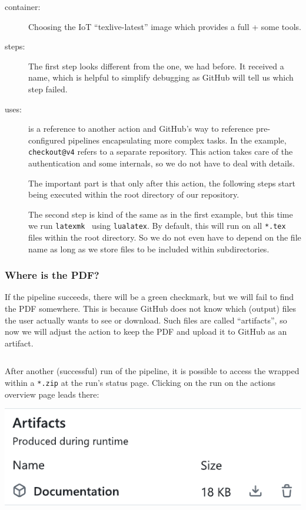 \documentclass[final]{ltugboat}
\newcommand*{\TeXLive}{\acro{\TeX\,Live}\xspace}
\newcommand*{\action}[1]{\texttt{#1}}
\newcommand*{\command}[1]{\texttt{#1}}
\newcommand*{\file}[1]{\texttt{#1}}
\newcommand*{\containerimage}[1]{\enquote{#1}}
\begin{document}
\begin{description}
\item[container:] Choosing the IoT \containerimage{texlive-latest} image which provides a full \TeXLive{} + some tools\cite{islandoftex-docker}.
\item[steps:]
The first step looks different from the one, we had before.
It received a name, which is helpful to simplify debugging as GitHub will tell us which step failed.

\item[uses:] is a reference to another action and GitHub's way to reference pre-configured pipelines encapsulating more complex tasks.
In the example, \action{checkout@v4} refers to a separate repository\cite{github-action-checkout}.
This action takes care of the authentication and some internals, so we do not have to deal with details.

The important part is that only after this action, the following steps start being executed within the root directory of our repository.

The second step is kind of the same as in the first example, but this time we run \command{latexmk}~\cite{latexmk} using \command{lualatex}.
By default, this will run on all \file{*.tex} files within the root directory.
So we do not even have to depend on the file name as long as we store files to be included within subdirectories.
\end{description}

\subsubsection{Where is the PDF?}
If the pipeline succeeds, there will be a green checkmark, but we will fail to find the PDF somewhere.
This is because GitHub does not know which (output) files the user actually wants to see or download.
Such files are called \enquote{artifacts}, so now we will adjust the action to keep the PDF and upload it to GitHub as an artifact.

\inputminted[firstline=13, lastline=17,autogobble]{yaml}{examples/latex-basic.yml}

After another (successful) run of the pipeline, it is possible to access the  wrapped within a \file{*.zip} at the run's status page.
Clicking on the run on the actions overview page leads there:

\noindent\includegraphics[width=\linewidth,alt={Cropping of a screenshot. It shows the GitHub artifacts download section. A Packaged artifact called “Documentation” is available.}]{screenshot-artifacts}
\end{document}

